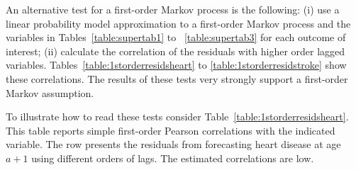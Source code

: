 \noindent An alternative test for a first-order Markov process is the following: (i) use a linear probability model approximation to a first-order Markov process and the variables in Tables~\ref{table:supertab1} to ~\ref{table:supertab3} for each outcome of interest; (ii) calculate the correlation of the residuals with higher order lagged variables. Tables~\ref{table:1storderresidsheart} to \ref{table:1storderresidstroke} show these correlations. The results of these tests very strongly support a first-order Markov assumption.

\noindent To illustrate how to read these tests consider Table~\ref{table:1storderresidsheart}. This table reports simple first-order Pearson correlations with the indicated variable. The row presents the residuals from forecasting heart disease at age $a+1$ using different orders of lags. The estimated correlations are low.

